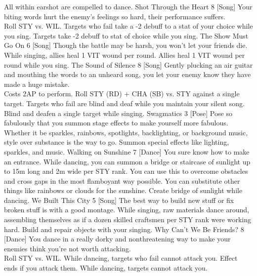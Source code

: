 \begin{path}
{All within earshot are compelled to dance.}
\skilldescription
{Shot Through the Heart}
{8}
[Song]
{Your biting words hurt the enemy's feelings so hard, their performance suffers.
\\Roll STY vs. WIL. Targets who fail take a -2 debuff to a stat of your choice while you sing.}
{Targets take -2 debuff to stat of choice while you sing.}
\skilldescription
{The Show Must Go On}
{6}
[Song]
{Though the battle may be harsh, you won't let your friends die. While singing, allies heal 1 VIT wound per round.}
{Allies heal 1 VIT wound per round while you sing.}
\skilldescription
{The Sound of Silence}
{8}
[Song]
{Gently plucking an air guitar and mouthing the words to an unheard song, you let your enemy know they have made a huge mistake.
\\Costs 2AP to perform. Roll STY (RD) + CHA (SB) vs. STY against a single target. Targets who fail are blind and deaf while you maintain your silent song.}
{Blind and deafen a single target while singing.}
\skilldescription
{Swagmatics}
{3}
[Pose]
{Pose so fabulously that you summon stage effects to make yourself more fabulous. Whether it be sparkles, rainbows, spotlights, backlighting, or background music, style over substance is the way to go.}
{Summon special effects like lighting, sparkles, and music.}
\skilldescription
{Walking on Sunshine}
{7}
[Dance]
{You sure know how to make an entrance. While dancing, you can summon a bridge or staircase of sunlight up to 15m long and 2m wide per STY rank. You can use this to overcome obstacles and cross gaps in the most flamboyant way possible. You can substitute other things like rainbows or clouds for the sunshine.}
{Create bridge of sunlight while dancing.}
\skilldescription
{We Built This City}
{5}
[Song]
{The best way to build new stuff or fix broken stuff is with a good montage. While singing, raw materials dance around, assembling themselves as if a dozen skilled craftsmen per STY rank were working hard.}
{Build and repair objects with your singing.}
\skilldescription
{Why Can't We Be Friends?}
{8}
[Dance]
{You dance in a really dorky and nonthreatening way to make your enemies think you're not worth attacking.
\\Roll STY vs. WIL. While dancing, targets who fail cannot attack you. Effect ends if you attack them.}
{While dancing, targets cannot attack you.}

\end{path}
